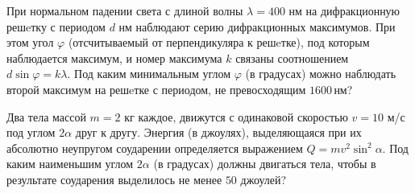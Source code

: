 \begin{consultation}
\begin{listofex}
		\item При нормальном падении света с длиной волны \( \lambda=400 \) нм на дифракционную решeтку с периодом \(d\) нм наблюдают серию дифракционных максимумов. При этом угол \(\varphi\)  (отсчитываемый от перпендикуляра к решeтке), под которым наблюдается максимум, и номер максимума \(k\) связаны соотношением \(d \sin \varphi= k\lambda\). Под каким минимальным углом \(\varphi\) (в градусах) можно наблюдать второй максимум на решeтке с периодом, не превосходящим \(1600\) нм?
		\item Два тела массой \(m=2\) кг каждое, движутся с одинаковой скоростью  \(v =10\) м/с под углом \(2\alpha\) друг к другу. Энергия (в джоулях), выделяющаяся при их абсолютно неупругом соударении определяется выражением \(Q= m v^2 \sin^2 \alpha \). Под каким наименьшим углом \(2\alpha\) (в градусах) должны двигаться тела, чтобы в результате соударения выделилось не менее \(50\) джоулей?
	\end{listofex}
\end{consultation}


